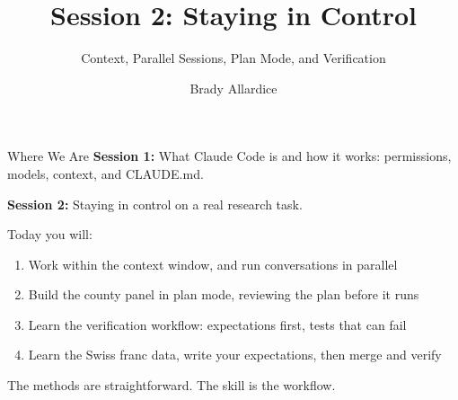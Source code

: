 \documentclass[aspectratio=169, 11pt]{beamer}
\title{Session 2: Staying in Control}
\subtitle{Context, Parallel Sessions, Plan Mode, and Verification}
\author{Brady Allardice}
\date{}
\institute{UPF \& IBEI}
\begin{document}
\begin{frame}[plain]
  \titlepage
\end{frame}


\begin{frame}{Where We Are}
  \textbf{Session 1:} What Claude Code is and how it works: permissions, models, context, and CLAUDE.md.

  \vspace{1em}
  \textbf{Session 2:} Staying in control on a real research task.

  \vspace{1em}
  Today you will:
  \begin{enumerate}
    \item Work within the context window, and run conversations in parallel
    \item Build the county panel in plan mode, reviewing the plan before it runs
    \item Learn the verification workflow: expectations first, tests that can fail
    \item Learn the Swiss franc data, write your expectations, then merge and verify
  \end{enumerate}

  \vspace{0.5em}
  \alert{The methods are straightforward. The skill is the workflow.}
\end{frame}
\end{document}

